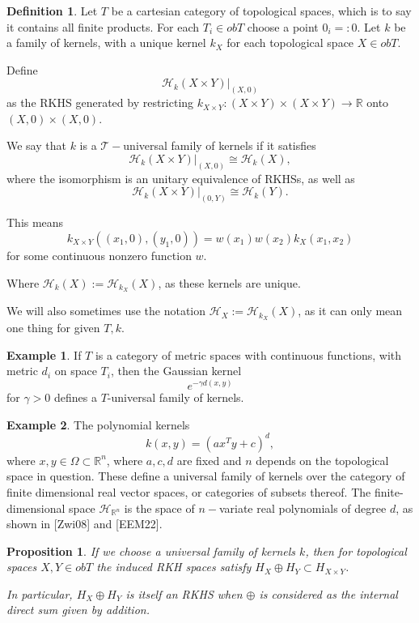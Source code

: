 \documentclass[12pt]{amsart}
\newtheorem{proposition}[theorem]{Proposition}
\theoremstyle{definition}
\newtheorem{definition}[theorem]{Definition}
\newtheorem{example}{Example}[theorem]
\numberwithin{equation}{section}
\begin{document}
\begin{definition}
    Let $T$ be a cartesian category of topological spaces, which is to say it contains all finite products. For each $T_i \in obT$ choose a point $0_i =: 0$. Let $k$ be a family of kernels, with a unique kernel $k_X$ for each topological space $X \in obT$. 

    Define \[\mathcal H_{k}(X\times Y)|_{(X, 0)}\] as the RKHS generated by restricting $k_{X\times Y}: (X\times Y)\times (X\times Y) \rightarrow \mathbb R$ onto $(X, 0)\times (X, 0).$

    We say that $k$ is a $\mathcal T -$universal family of kernels if it satisfies \[\mathcal H_{k}(X\times Y)|_{(X, 0)} \cong \mathcal H_k(X),\] where the isomorphism is an unitary equivalence of RKHSs, as well as \[\mathcal H_{k}(X\times Y)|_{(0, Y)} \cong \mathcal H_k(Y).\]
    
    This means \[k_{X \times Y}((x_1, 0), (y_1,0)) = w(x_1)w(x_2)k_X(x_1, x_2)\] for some continuous nonzero function $w$. 

    Where $\mathcal H_{k}(X) := \mathcal H_{k_X}(X)$, as these kernels are unique. 

    We will also sometimes use the notation $\mathcal H_X := \mathcal H_{k_{X}}(X)$, as it can only mean one thing for given $T, k$. 
\end{definition}

\begin{example}
    If $T$ is a category of metric spaces with continuous functions, with metric $d_i$ on space $T_i$, then the Gaussian kernel \[e^{-\gamma d(x,y)}\] for $\gamma >0$ defines a $T$-universal family of kernels.
\end{example}

\begin{example}
    The polynomial kernels \[k(x, y) = (ax^Ty + c)^d,\] where $x, y \in \Omega \subset \mathbb R^n$, where $a, c, d$ are fixed and $n$ depends on the topological space in question. These define a universal family of kernels over the category of finite dimensional real vector spaces, or categories of subsets thereof. The finite-dimensional space $\mathcal H_{\mathbb R^n}$ is the space of $n-$variate real polynomials of degree $d$, as shown in [Zwi08] and [EEM22].

\end{example}


\begin{proposition}
    If we choose a universal family of kernels $k$, then for topological spaces $X, Y \in obT$ the induced RKH spaces satisfy $H_X \oplus H_Y \subset H_{X\times Y}$.
    
    In particular, $H_X \oplus H_Y$ is itself an RKHS when $\oplus$ is considered as the internal direct sum given by addition. 
\end{proposition}
\end{document}
